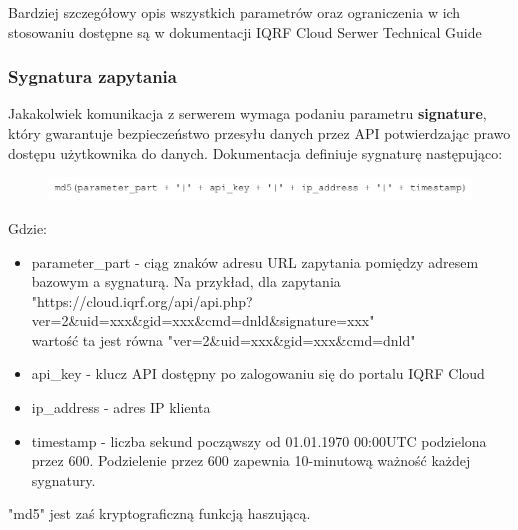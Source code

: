 \documentclass[a4paper, 12pt]{article}
\begin{document}
Bardziej szczegółowy opis wszystkich parametrów oraz ograniczenia w ich stosowaniu dostępne są w dokumentacji IQRF Cloud Serwer Technical Guide 
\cite{iqrfcloud-guide}

\subsubsection{Sygnatura zapytania}

Jakakolwiek komunikacja z serwerem wymaga podaniu parametru \textbf{signature}, który gwarantuje bezpieczeństwo przesyłu danych przez API 
potwierdzając prawo dostępu użytkownika do danych. Dokumentacja \cite{iqrfcloud-guide} definiuje sygnaturę następująco:

\begin{figure}[H]
    \includegraphics[width=\textwidth]{zdj/md5.png}
\end{figure}

Gdzie: 

\begin{itemize}
    \item parameter\_part - ciąg znaków adresu URL zapytania pomiędzy adresem bazowym a sygnaturą. Na przykład, dla zapytania \\
"https://cloud.iqrf.org/api/api.php?ver=2\&uid=xxx\&gid=xxx\&cmd=dnld\&signature=xxx" \\ 
wartość ta jest równa "ver=2\&uid=xxx\&gid=xxx\&cmd=dnld"
    \item api\_key - klucz API dostępny po zalogowaniu się do portalu IQRF Cloud
    \item ip\_address - adres IP klienta
    \item timestamp - liczba sekund począwszy od 01.01.1970 00:00UTC podzielona przez 600. Podzielenie przez 600 zapewnia 10-minutową
ważność każdej sygnatury.
\end{itemize}

"md5" jest zaś kryptograficzną funkcją haszującą. 
\end{document}
